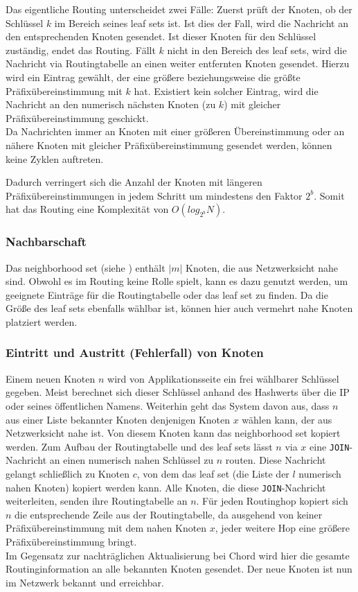 Das eigentliche Routing unterscheidet zwei Fälle: Zuerst prüft der Knoten, ob der Schlüssel $k$ im Bereich seines leaf sets ist. Ist dies der Fall, wird die Nachricht an den entsprechenden Knoten gesendet. Ist dieser Knoten für den Schlüssel zuständig, endet das Routing. Fällt $k$ nicht in den Bereich des leaf sets, wird die Nachricht via Routingtabelle an einen weiter entfernten Knoten gesendet. Hierzu wird ein Eintrag gewählt, der eine größere beziehungsweise die größte Präfixübereinstimmung mit $k$ hat. Existiert kein solcher Eintrag, wird die Nachricht an den numerisch nächsten Knoten (zu $k$) mit gleicher Präfixübereinstimmung geschickt.\\
Da Nachrichten immer an Knoten mit einer größeren Übereinstimmung oder an nähere Knoten mit gleicher Präfixübereinstimmung gesendet werden, können keine Zyklen auftreten.

Dadurch verringert sich die Anzahl der Knoten mit längeren Präfixübereinstimmungen in jedem Schritt um mindestens den Faktor $2^b$. Somit hat das Routing eine Komplexität von $O(log_{2^b} N)$.

\subsubsection{Nachbarschaft}
Das neighborhood set (siehe ) enthält $|m|$ Knoten, die aus Netzwerksicht nahe sind. Obwohl es im Routing keine Rolle spielt, kann es dazu genutzt werden, um geeignete Einträge für die Routingtabelle oder das leaf set zu finden. Da die Größe des leaf sets ebenfalls wählbar ist, können hier auch vermehrt nahe Knoten platziert werden.

\subsubsection{Eintritt und Austritt (Fehlerfall) von Knoten}
Einem neuen Knoten $n$ wird von Applikationsseite ein frei wählbarer Schlüssel gegeben. Meist berechnet sich dieser Schlüssel anhand des Hashwerts über die IP oder seines öffentlichen Namens. Weiterhin geht das System davon aus, dass $n$ aus einer Liste bekannter Knoten denjenigen Knoten $x$ wählen kann, der aus Netzwerksicht nahe ist. Von diesem Knoten kann das neighborhood set kopiert werden. Zum Aufbau der Routingtabelle und des leaf sets lässt $n$ via $x$ eine \texttt{JOIN}-Nachricht an einen numerisch nahen Schlüssel zu $n$ routen. Diese Nachricht gelangt schließlich zu Knoten $c$, von dem das leaf set (die Liste der $l$ numerisch nahen Knoten) kopiert werden kann. Alle Knoten, die diese \texttt{JOIN}-Nachricht weiterleiten, senden ihre Routingtabelle an $n$. Für jeden Routinghop kopiert sich $n$ die entsprechende Zeile aus der Routingtabelle, da ausgehend von keiner Präfixübereinstimmung mit dem nahen Knoten $x$, jeder weitere Hop eine größere Präfixübereinstimmung bringt.\\
Im Gegensatz zur nachträglichen Aktualisierung bei Chord wird hier die gesamte Routinginformation an alle bekannten Knoten gesendet. Der neue Knoten ist nun im Netzwerk bekannt und erreichbar.


